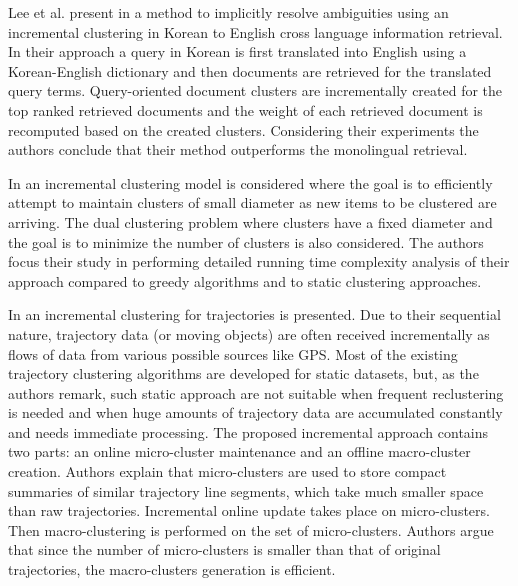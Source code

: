 Lee et al. present in \cite{Lee02Inc} a method to implicitly resolve ambiguities using an incremental clustering in Korean to English cross language information retrieval. In their approach a query in Korean is first translated into English using a Korean-English dictionary and then documents are retrieved for the translated query terms. Query-oriented document clusters are incrementally created for the top ranked retrieved documents and the weight of each retrieved document is recomputed based on the created clusters. Considering their experiments the authors conclude that their method outperforms the monolingual retrieval.

In \cite{Charikar97Inc} an incremental clustering model is considered where the goal is to efficiently attempt to maintain clusters of small diameter as new items to be clustered are arriving. The dual clustering problem where clusters have a fixed diameter and the goal is to minimize the number of clusters is also considered. The authors focus their study in performing detailed running time complexity analysis of their approach compared to greedy algorithms and  to static clustering approaches. 

In \cite{Li10Incclust} an incremental clustering for trajectories is presented. Due to their sequential nature, trajectory data (or moving objects) are often received incrementally as flows of data from various possible sources like GPS. Most of the existing trajectory clustering algorithms are developed for static datasets, but, as the authors remark, such static approach are not suitable when frequent reclustering is needed and when  huge amounts of trajectory data are  accumulated constantly and needs immediate processing.
The proposed incremental approach contains two parts: an online micro-cluster maintenance and an offline macro-cluster
creation. Authors explain that micro-clusters are used to store compact summaries of similar trajectory line segments, which take much smaller space than raw trajectories. Incremental online update takes place on micro-clusters. Then 
macro-clustering is performed on the set of micro-clusters. Authors argue that since the number of micro-clusters is smaller than that of original trajectories, the macro-clusters generation is efficient. 

